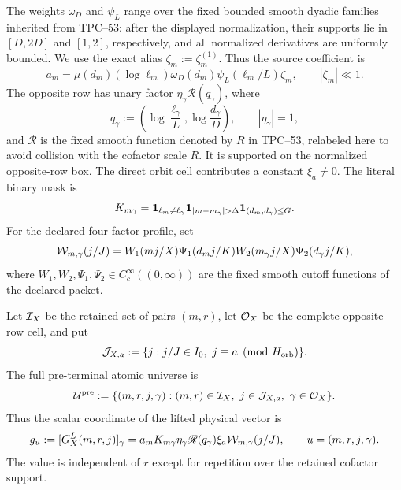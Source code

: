 The weights \(\omega_D\) and \(\psi_L\) range over the fixed bounded
smooth dyadic families inherited from TPC--53: after the displayed
normalization, their supports lie in \([D,2D]\) and \([1,2]\),
respectively, and all normalized derivatives are uniformly bounded.
We use the exact alias \(\zeta_m:=\zeta_m^{(1)}\).  Thus the source
coefficient is
\begin{equation}
 a_m
 =\mu(d_m)(\log\ell_m)\omega_D(d_m)
   \psi_L(\ell_m/L)\zeta_m,
 \qquad |\zeta_m|\ll1.
 \label{eq:tpc55-source-coefficient}
\end{equation}
The opposite row has unary factor
\(\eta_\gamma\mathscr R(q_\gamma)\), where
\begin{equation}
 q_\gamma
 :=\left(\log\frac{\ell_\gamma}{L},
          \log\frac{d_\gamma}{D}\right),
 \qquad |\eta_\gamma|=1,
 \label{eq:tpc55-normalized-opposite-row}
\end{equation}
and \(\mathscr R\) is the fixed smooth function denoted by \(R\) in
TPC--53, relabeled here to avoid collision with the cofactor scale \(R\).
It is supported on the normalized opposite-row
box.  The direct
orbit cell contributes a constant \(\xi_a\ne0\).  The literal binary mask
is
\begin{equation}
 K_{m\gamma}
 =\one_{\ell_m\ne\ell_\gamma}
  \one_{|m-m_\gamma|>\Delta}
  \one_{(d_m,d_\gamma)\le G}.
 \label{eq:tpc55-mask}
\end{equation}
For the declared four-factor profile, set
\begin{equation}
 \mathcal W_{m,\gamma}(j/J)
 =W_1(mj/X)\Psi_1(d_mj/K)
  W_2(m_\gamma j/X)\Psi_2(d_\gamma j/K),
 \label{eq:tpc55-four-factor-profile}
\end{equation}
where \(W_1,W_2,\Psi_1,\Psi_2\in C_c^\infty((0,\infty))\) are the fixed
smooth cutoff functions of the declared packet.

Let \(\mathcal I_X\) be the retained set of pairs \((m,r)\), let \(\mathcal O_X\) be
the complete opposite-row cell, and put
\begin{equation}
 \mathcal J_{X,a}
 :=\{j:j/J\in I_0,\ j\equiv a\pmod{H_{\rm orb}}\}.
 \label{eq:tpc55-retained-orbit-set}
\end{equation}
The full pre-terminal atomic universe is
\begin{equation}
 \mathcal U^{\rm pre}
 :=\{(m,r,j,\gamma):(m,r)\in\mathcal I_X,\
       j\in\mathcal J_{X,a},\ \gamma\in\mathcal O_X\}.
 \label{eq:tpc55-preterminal-universe}
\end{equation}
Thus the scalar coordinate of the lifted physical vector is
\begin{equation}
 g_u:=[G_X^L(m,r,j)]_\gamma
 =a_mK_{m\gamma}\eta_\gamma\mathscr R(q_\gamma)\xi_a
   \mathcal W_{m,\gamma}(j/J),
 \qquad u=(m,r,j,\gamma).
 \label{eq:tpc55-literal-atom}
\end{equation}
The value is independent of \(r\) except for repetition over the retained
cofactor support.

